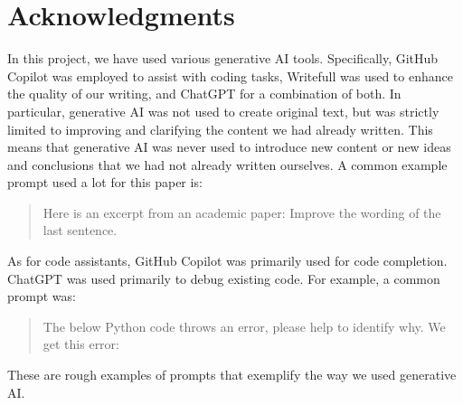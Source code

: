 \chapter{Acknowledgments}
In this project, we have used various generative AI tools. Specifically, GitHub Copilot was employed to assist with coding tasks, Writefull was used to enhance the quality of our writing, and ChatGPT for a combination of both. In particular, generative AI was not used to create original text, but was strictly limited to improving and clarifying the content we had already written. This means that generative AI was never used to introduce new content or new ideas and conclusions that we had not already written ourselves. A common example prompt used a lot for this paper is:
\begin{quote}
    Here is an excerpt from an academic paper:  \newline
    Improve the wording of the last sentence.
\end{quote}

As for code assistants, GitHub Copilot was primarily used for code completion. ChatGPT was used primarily to debug existing code. For example, a common prompt was: 
\begin{quote}
    The below Python code throws an error, please help to identify why.  \newline
    We get this error: 
\end{quote}
These are rough examples of prompts that exemplify the way we used generative AI.


